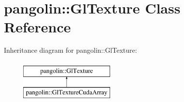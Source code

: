 \hypertarget{classpangolin_1_1_gl_texture}{}\section{pangolin\+:\+:Gl\+Texture Class Reference}
\label{classpangolin_1_1_gl_texture}
Inheritance diagram for pangolin\+:\+:Gl\+Texture\+:\begin{figure}[H]
\begin{center}
\leavevmode
\includegraphics[height=2.000000cm]{classpangolin_1_1_gl_texture}
\end{center}
\end{figure}

